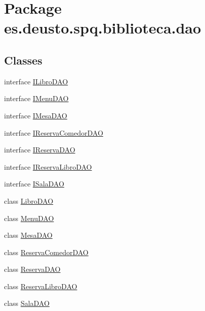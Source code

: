 \hypertarget{namespacees_1_1deusto_1_1spq_1_1biblioteca_1_1dao}{}\section{Package es.\+deusto.\+spq.\+biblioteca.\+dao}
\label{namespacees_1_1deusto_1_1spq_1_1biblioteca_1_1dao}
\subsection*{Classes}
\begin{DoxyCompactItemize}
\item 
interface \mbox{\hyperlink{interfacees_1_1deusto_1_1spq_1_1biblioteca_1_1dao_1_1_i_libro_d_a_o}{I\+Libro\+D\+AO}}
\item 
interface \mbox{\hyperlink{interfacees_1_1deusto_1_1spq_1_1biblioteca_1_1dao_1_1_i_menu_d_a_o}{I\+Menu\+D\+AO}}
\item 
interface \mbox{\hyperlink{interfacees_1_1deusto_1_1spq_1_1biblioteca_1_1dao_1_1_i_mesa_d_a_o}{I\+Mesa\+D\+AO}}
\item 
interface \mbox{\hyperlink{interfacees_1_1deusto_1_1spq_1_1biblioteca_1_1dao_1_1_i_reserva_comedor_d_a_o}{I\+Reserva\+Comedor\+D\+AO}}
\item 
interface \mbox{\hyperlink{interfacees_1_1deusto_1_1spq_1_1biblioteca_1_1dao_1_1_i_reserva_d_a_o}{I\+Reserva\+D\+AO}}
\item 
interface \mbox{\hyperlink{interfacees_1_1deusto_1_1spq_1_1biblioteca_1_1dao_1_1_i_reserva_libro_d_a_o}{I\+Reserva\+Libro\+D\+AO}}
\item 
interface \mbox{\hyperlink{interfacees_1_1deusto_1_1spq_1_1biblioteca_1_1dao_1_1_i_sala_d_a_o}{I\+Sala\+D\+AO}}
\item 
class \mbox{\hyperlink{classes_1_1deusto_1_1spq_1_1biblioteca_1_1dao_1_1_libro_d_a_o}{Libro\+D\+AO}}
\item 
class \mbox{\hyperlink{classes_1_1deusto_1_1spq_1_1biblioteca_1_1dao_1_1_menu_d_a_o}{Menu\+D\+AO}}
\item 
class \mbox{\hyperlink{classes_1_1deusto_1_1spq_1_1biblioteca_1_1dao_1_1_mesa_d_a_o}{Mesa\+D\+AO}}
\item 
class \mbox{\hyperlink{classes_1_1deusto_1_1spq_1_1biblioteca_1_1dao_1_1_reserva_comedor_d_a_o}{Reserva\+Comedor\+D\+AO}}
\item 
class \mbox{\hyperlink{classes_1_1deusto_1_1spq_1_1biblioteca_1_1dao_1_1_reserva_d_a_o}{Reserva\+D\+AO}}
\item 
class \mbox{\hyperlink{classes_1_1deusto_1_1spq_1_1biblioteca_1_1dao_1_1_reserva_libro_d_a_o}{Reserva\+Libro\+D\+AO}}
\item 
class \mbox{\hyperlink{classes_1_1deusto_1_1spq_1_1biblioteca_1_1dao_1_1_sala_d_a_o}{Sala\+D\+AO}}
\end{DoxyCompactItemize}

